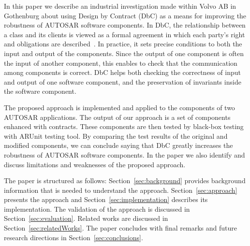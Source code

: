 In this paper we describe an industrial investigation made within Volvo AB in Gothenburg about using %
Design by Contract (DbC) as a means for improving the robustness of AUTOSAR software components. 
In DbC, the relationship between a class and its clients is viewed as a formal agreement in which each party's right and obligations are described~\cite{jj}. In practice, it sets precise conditions to both the input and output of the components. %
Since the output of one component is often the input of another component, this enables to check that the communication among components is correct. DbC helps both checking the correctness of input and output of one software component, and %
the preservation of invariants inside the software component. %
%


The proposed approach is implemented and applied to the components of two AUTOSAR applications. %
The output of our approach is a set of components enhanced with contracts. These  components %
are then tested by black-box testing with ARUnit testing tool. By comparing the test results of the original and modified components, we can conclude saying that DbC greatly increases the robustness of AUTOSAR software components. In the paper we also identify and discuss limitations and weaknesses of the proposed approach.

The paper is structured as follows: Section~\ref{sec:background} provides background information that is needed to understand the approach. Section~\ref{sec:approach} presents the approach and Section~\ref{sec:implementation} describes its implementation. The validation of the approach is discussed in Section~\ref{sec:evaluation}. Related works are discussed in Section~\ref{sec:relatedWorks}. The paper concludes with final remarks and future research directions in Section~\ref{sec:conclusions}.


